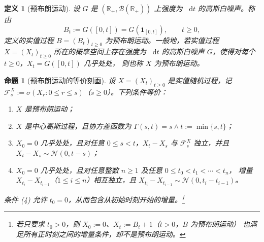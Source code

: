 \documentclass[UTF8,11pt,a4paper,oneside,fontset=fandol]{ctexrep}
\numberwithin{equation}{section}
\theoremstyle{zhthm}
\newtheorem{proposition}[theorem]{命题}
\newtheorem{definition}[theorem]{定义}
\newcommand{\R}{\mathbb{R}}
\newcommand{\B}{\mathcal{B}}
\newcommand{\F}{\mathcal{F}}
\newcommand{\Normal}{\mathcal{N}}
\newcommand{\ind}[1]{\mathbf{1}_{#1}}
\newcommand{\dd}{\mathop{}\!\mathrm{d}}
\begin{document}
\begin{definition}[预布朗运动]
\label{def:pre-brownian-motion}
设 $G$ 是 $(\R_+,\B(\R_+))$ 上强度为 $\dd t$ 的高斯白噪声。称由
\[
  B_t:=G([0,t])=G(\ind{[0,t]}),\qquad t\ge0,
\]
定义的实值过程 $B=(B_t)_{t\ge0}$ 为预布朗运动。一般地，若实值过程 $X=(X_t)_{t\ge0}$
所在的概率空间上存在强度为 $\dd t$ 的高斯白噪声 $G$，使得对每个 $t\ge0$，$X_t=G([0,t])$ 几乎处处，
则也称 $X$ 为预布朗运动。
\end{definition}

\begin{proposition}[预布朗运动的等价刻画]
\label{prop:pre-brownian-equivalences}
设 $X=(X_t)_{t\ge0}$ 是实值随机过程，记 $\F_s^X:=\sigma(X_r:0\le r\le s)$（$s\ge0$）。下列条件等价：
\begin{enumerate}
  \item $X$ 是预布朗运动；
  \item $X$ 是中心高斯过程，且协方差函数为 $\Gamma(s,t)=s\wedge t:=\min\{s,t\}$；
  \item $X_0=0$ 几乎处处，且对任意 $0\le s<t$，$X_t-X_s$ 与 $\F_s^X$ 独立，并且 $X_t-X_s\sim\Normal(0,t-s)$；
  \item $X_0=0$ 几乎处处，且对任意整数 $n\ge1$ 及任意 $0\le t_0<t_1<\cdots<t_n$，
    增量 $X_{t_i}-X_{t_{i-1}}$（$1\le i\le n$）相互独立，且 $X_{t_i}-X_{t_{i-1}}\sim\Normal(0,t_i-t_{i-1})$。
\end{enumerate}
条件 (4) 允许 $t_0=0$，从而包含从初始时刻开始的增量。\footnote{%
  若只要求 $t_0>0$，则 $X_0:=0$、$X_t:=B_t+1$（$t>0$，$B$ 为预布朗运动）
  也满足所有正时刻之间的增量条件，却不是预布朗运动。}
\end{proposition}
\end{document}
